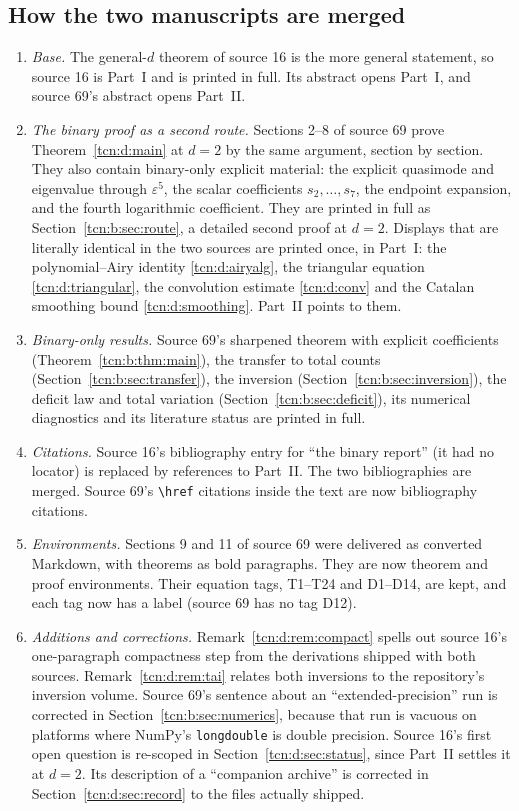 \documentclass[11pt,letterpaper]{article}
\newcommand{\eps}{\varepsilon}
\theoremstyle{remark}
\begin{document}
\subsection{How the two manuscripts are merged}\label{tcn:sec:merge}
\begin{enumerate}[itemsep=2pt]
\item \emph{Base.} The general-$d$ theorem of source 16 is the more general statement, so source 16 is Part~I and is printed in full. Its abstract opens Part~I, and source 69's abstract opens Part~II.
\item \emph{The binary proof as a second route.} Sections 2--8 of source 69 prove Theorem~\ref{tcn:d:main} at $d=2$ by the same argument, section by section. They also contain binary-only explicit material: the explicit quasimode and eigenvalue through $\eps^5$, the scalar coefficients $s_2,\dots,s_7$, the endpoint expansion, and the fourth logarithmic coefficient. They are printed in full as Section~\ref{tcn:b:sec:route}, a detailed second proof at $d=2$. Displays that are literally identical in the two sources are printed once, in Part~I: the polynomial--Airy identity \eqref{tcn:d:airyalg}, the triangular equation \eqref{tcn:d:triangular}, the convolution estimate \eqref{tcn:d:conv} and the Catalan smoothing bound \eqref{tcn:d:smoothing}. Part~II points to them.
\item \emph{Binary-only results.} Source 69's sharpened theorem with explicit coefficients (Theorem~\ref{tcn:b:thm:main}), the transfer to total counts (Section~\ref{tcn:b:sec:transfer}), the inversion (Section~\ref{tcn:b:sec:inversion}), the deficit law and total variation (Section~\ref{tcn:b:sec:deficit}), its numerical diagnostics and its literature status are printed in full.
\item \emph{Citations.} Source 16's bibliography entry for ``the binary report'' (it had no locator) is replaced by references to Part~II. The two bibliographies are merged. Source 69's \texttt{\textbackslash href} citations inside the text are now bibliography citations.
\item \emph{Environments.} Sections 9 and 11 of source 69 were delivered as converted Markdown, with theorems as bold paragraphs. They are now theorem and proof environments. Their equation tags, T1--T24 and D1--D14, are kept, and each tag now has a label (source 69 has no tag D12).
\item \emph{Additions and corrections.} Remark~\ref{tcn:d:rem:compact} spells out source 16's one-paragraph compactness step from the derivations shipped with both sources. Remark~\ref{tcn:d:rem:tai} relates both inversions to the repository's inversion volume. Source 69's sentence about an ``extended-precision'' run is corrected in Section~\ref{tcn:b:sec:numerics}, because that run is vacuous on platforms where NumPy's \texttt{longdouble} is double precision. Source 16's first open question is re-scoped in Section~\ref{tcn:d:sec:status}, since Part~II settles it at $d=2$. Its description of a ``companion archive'' is corrected in Section~\ref{tcn:d:sec:record} to the files actually shipped.

\end{enumerate}
\end{document}
